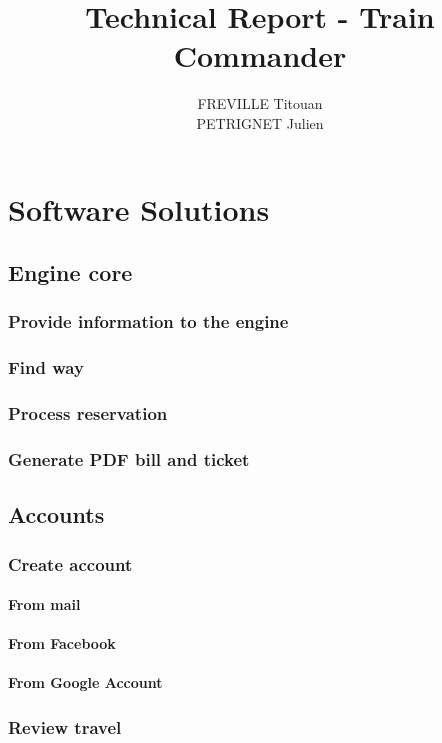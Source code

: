 \documentclass[a4paper,10pt]{report}
\title{Technical Report - Train Commander}
\author{
  FREVILLE Titouan \\
  PETRIGNET Julien
}
\begin{document}
\maketitle

\begin{abstract}
\end{abstract}

\part{Software Solutions}
  \chapter{Engine core}
    \section{Provide information to the engine}
    \section{Find way}
    \section{Process reservation}
    \section{Generate PDF bill and ticket}
  \chapter{Accounts}
    \section{Create account}
      \subsection{From mail}
      \subsection{From Facebook}
      \subsection{From Google Account}
    \section {Review travel}
\end{document}
